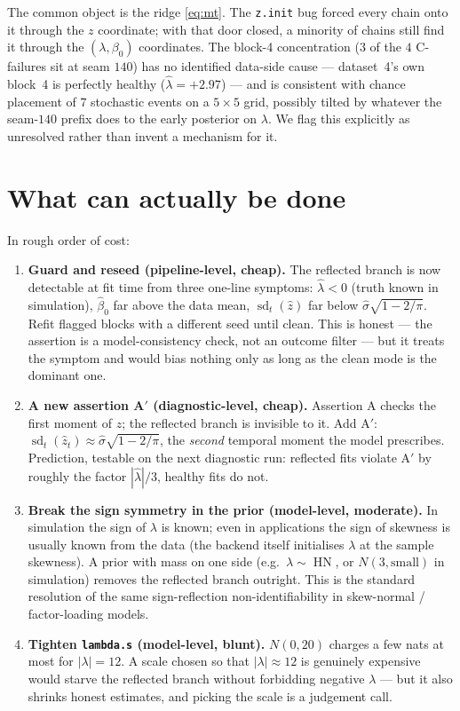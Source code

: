 \documentclass[11pt]{article}
\newcommand{\code}[1]{\texttt{#1}}
\DeclareMathOperator{\hn}{HN}
\DeclareMathOperator{\sd}{sd}
\begin{document}
The common object is the ridge \eqref{eq:mt}. The \code{z.init} bug forced
every chain onto it through the $z$ coordinate; with that door closed, a
minority of chains still find it through the $(\lambda, \beta_0)$ coordinates.
The block-4 concentration ($3$ of the $4$ C-failures sit at seam $140$) has no
identified data-side cause --- dataset~4's own block~4 is perfectly healthy
($\hat\lambda = +2.97$) --- and is consistent with chance placement of $7$
stochastic events on a $5 \times 5$ grid, possibly tilted by whatever the
seam-$140$ prefix does to the early posterior on $\lambda$. We flag this
explicitly as unresolved rather than invent a mechanism for it.

\section{What can actually be done}

In rough order of cost:

\begin{enumerate}\itemsep3pt
  \item \textbf{Guard and reseed (pipeline-level, cheap).} The reflected branch
        is now detectable at fit time from three one-line symptoms: $\hat\lambda
        < 0$ (truth known in simulation), $\hat\beta_0$ far above the data mean,
        $\sd_t(\hat z)$ far below $\hat\sigma\sqrt{1 - 2/\pi}$. Refit flagged
        blocks with a different seed until clean. This is honest --- the
        assertion is a model-consistency check, not an outcome filter --- but it
        treats the symptom and would bias nothing only as long as the clean
        mode is the dominant one.
  \item \textbf{A new assertion A$'$ (diagnostic-level, cheap).} Assertion A
        checks the first moment of $z$; the reflected branch is invisible to it.
        Add A$'$: $\sd_t(\hat z_t) \approx \hat\sigma\sqrt{1-2/\pi}$, the
        \emph{second} temporal moment the model prescribes. Prediction, testable
        on the next diagnostic run: reflected fits violate A$'$ by roughly the
        factor $|\hat\lambda|/3$, healthy fits do not.
  \item \textbf{Break the sign symmetry in the prior (model-level, moderate).}
        In simulation the sign of $\lambda$ is known; even in applications the
        sign of skewness is usually known from the data (the backend itself
        initialises $\lambda$ at the sample skewness). A prior with mass on one
        side (e.g.\ $\lambda \sim \hn$, or $N(3, \text{small})$ in simulation)
        removes the reflected branch outright. This is the standard resolution
        of the same sign-reflection non-identifiability in skew-normal /
        factor-loading models.
  \item \textbf{Tighten \code{lambda.s} (model-level, blunt).} $N(0, 20)$
        charges a few nats at most for $|\lambda| = 12$. A scale chosen so that
        $|\lambda| \approx 12$ is genuinely expensive would starve the reflected
        branch without forbidding negative $\lambda$ --- but it also shrinks
        honest estimates, and picking the scale is a judgement call.
\end{enumerate}
\end{document}
